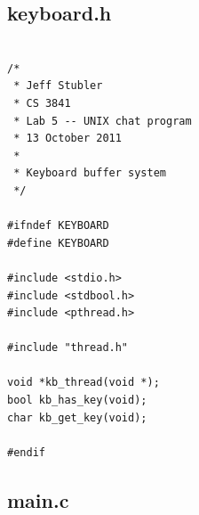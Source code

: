 \documentclass{article}
\begin{document}
\subsection*{keyboard.h}

\begin{verbatim}

/*
 * Jeff Stubler
 * CS 3841
 * Lab 5 -- UNIX chat program
 * 13 October 2011
 *
 * Keyboard buffer system
 */

#ifndef KEYBOARD
#define KEYBOARD

#include <stdio.h>
#include <stdbool.h>
#include <pthread.h>

#include "thread.h"

void *kb_thread(void *);
bool kb_has_key(void);
char kb_get_key(void);

#endif

\end{verbatim}

\subsection*{main.c}
\end{document}
